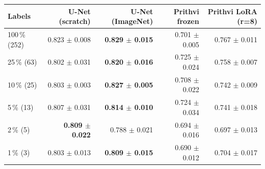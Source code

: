 \begin{tabular}{lrrrr}
\toprule
Labels & U-Net (scratch) & U-Net (ImageNet) & Prithvi frozen & Prithvi LoRA (r=8) \\
\midrule
100\,\% (252) & 0.823 $\pm$ 0.008 & \textbf{0.829 $\pm$ 0.015} & 0.701 $\pm$ 0.005 & 0.767 $\pm$ 0.011 \\
25\,\% (63) & 0.802 $\pm$ 0.031 & \textbf{0.820 $\pm$ 0.016} & 0.725 $\pm$ 0.024 & 0.758 $\pm$ 0.007 \\
10\,\% (25) & 0.803 $\pm$ 0.003 & \textbf{0.827 $\pm$ 0.005} & 0.708 $\pm$ 0.022 & 0.742 $\pm$ 0.009 \\
5\,\% (13) & 0.807 $\pm$ 0.031 & \textbf{0.814 $\pm$ 0.010} & 0.724 $\pm$ 0.034 & 0.741 $\pm$ 0.018 \\
2\,\% (5) & \textbf{0.809 $\pm$ 0.022} & 0.788 $\pm$ 0.021 & 0.694 $\pm$ 0.016 & 0.697 $\pm$ 0.013 \\
1\,\% (3) & 0.803 $\pm$ 0.013 & \textbf{0.809 $\pm$ 0.015} & 0.690 $\pm$ 0.012 & 0.704 $\pm$ 0.017 \\
\bottomrule
\end{tabular}

